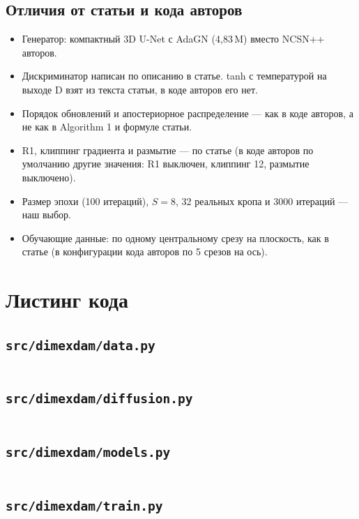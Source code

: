 \documentclass[11pt,a4paper]{article}
\newcommand{\codefile}[1]{\inputminted{python}{#1}}
\newcommand{\code}[1]{\texttt{#1}}
\begin{document}
\subsection{Отличия от статьи и кода авторов}\label{sec:diff}
\begin{itemize}
  \item Генератор: компактный 3D U-Net с AdaGN (4{,}83\,M) вместо NCSN++ авторов.
  \item Дискриминатор написан по описанию в статье. tanh с температурой на выходе D взят из текста статьи,
        в коде авторов его нет.
  \item Порядок обновлений и апостериорное распределение — как в коде авторов, а не как в Algorithm 1 и
        формуле статьи.
  \item R1, клиппинг градиента и размытие — по статье (в коде авторов по умолчанию другие значения: R1
        выключен, клиппинг 12, размытие выключено).
  \item Размер эпохи (100 итераций), $S=8$, 32 реальных кропа и 3000 итераций — наш выбор.
  \item Обучающие данные: по одному центральному срезу на плоскость, как в статье (в конфигурации кода
        авторов по 5 срезов на ось).
\end{itemize}

\newpage
\appendix
\section{Листинг кода}

\subsection{\code{src/dimexdam/data.py}}
\codefile{../src/dimexdam/data.py}

\subsection{\code{src/dimexdam/diffusion.py}}
\codefile{../src/dimexdam/diffusion.py}

\subsection{\code{src/dimexdam/models.py}}
\codefile{../src/dimexdam/models.py}

\subsection{\code{src/dimexdam/train.py}}
\codefile{../src/dimexdam/train.py}
\end{document}
